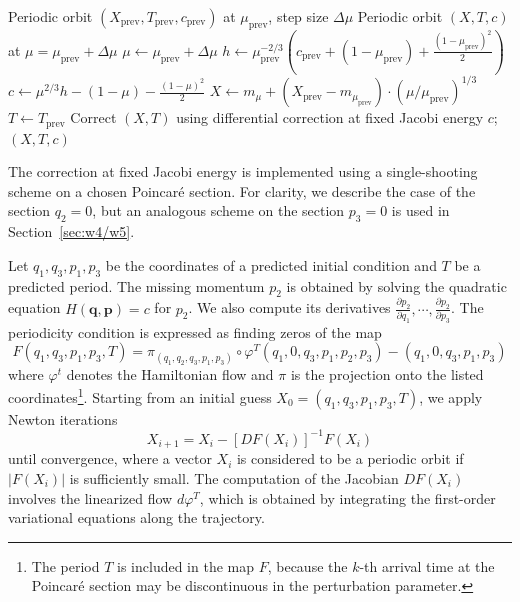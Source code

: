 \documentclass[pdflatex,sn-mathphys-ay]{sn-jnl}%
\theoremstyle{thmstyleone}%
\theoremstyle{thmstyletwo}%
\theoremstyle{thmstylethree}%
\renewcommand{\phi}{\varphi}
\begin{document}
\begin{algorithm}[!h]
\caption{Scaling continuation across small mass ratios}
\label{alg:scaling-conti}
\begin{algorithmic}[1]
\Require Periodic orbit $(X_{\text{prev}}, T_{\text{prev}}, c_{\text{prev}})$ at $\mu_{\text{prev}}$, step size $\Delta\mu$
\Ensure Periodic orbit $(X, T, c)$ at $\mu = \mu_{\text{prev}} + \Delta\mu$
\State $\mu \gets \mu_{\text{prev}} + \Delta\mu$\;
\State $h \gets \mu_{\text{prev}}^{-2/3} \left( c_{\text{prev}} + (1 - \mu_{\text{prev}}) + \frac{(1 - \mu_{\text{prev}})^2}{2} \right)$\;
\State $c \gets \mu^{2/3} h - (1 - \mu) - \frac{(1 - \mu)^2}{2}$\;
\State $X \gets m_\mu + (X_{\text{prev}} - m_{\mu_{\text{prev}}}) \cdot (\mu / \mu_{\text{prev}})^{1/3}$\;
\State $T \gets T_{\text{prev}}$\;
\State Correct $(X,T)$ using differential correction at fixed Jacobi energy $c$;
\State \Return $(X, T, c)$\;
\end{algorithmic}
\end{algorithm}

The correction at fixed Jacobi energy is implemented using a single-shooting scheme on a chosen Poincar\'e section. For clarity, we describe the case of the section $q_2=0$, but an analogous scheme on the section $p_3=0$ is used in Section~\ref{sec:w4/w5}.

Let $q_1,q_3,p_1,p_3$ be the coordinates of a predicted initial condition and $T$ be a predicted period.
The missing momentum $p_2$ is obtained by solving the quadratic equation $H(\mathbf{q},\mathbf{p})=c$ for $p_2$. We also compute its derivatives $\frac{\partial p_2}{\partial q_1},\cdots,\frac{\partial p_2}{\partial p_3}$.
The periodicity condition is expressed as finding zeros of the map
\[
F(q_1, q_3, p_1, p_3, T) = \pi_{(q_1, q_2, q_3, p_1, p_3)} \circ \phi^T(q_1, 0, q_3, p_1, p_2, p_3) - (q_1, 0, q_3, p_1, p_3)
\]
where $\phi^t$ denotes the Hamiltonian flow and $\pi$ is the projection onto the listed coordinates\footnote{The period $T$ is included in the map $F$, because the $k$-th arrival time at the Poincar\'e section may be discontinuous in the perturbation parameter.}.
Starting from an initial guess $X_0=(q_1, q_3, p_1, p_3, T)$, we apply Newton iterations
\[
X_{i+1} = X_i - [DF(X_i)]^{-1} F(X_i)
\]
until convergence, where a vector $X_i$ is considered to be a periodic orbit if $|F(X_i)|$ is sufficiently small. 
The computation of the Jacobian $DF(X_i)$ involves the linearized flow $d\phi^T$, which is obtained by integrating the first-order variational equations along the trajectory.
\end{document}
